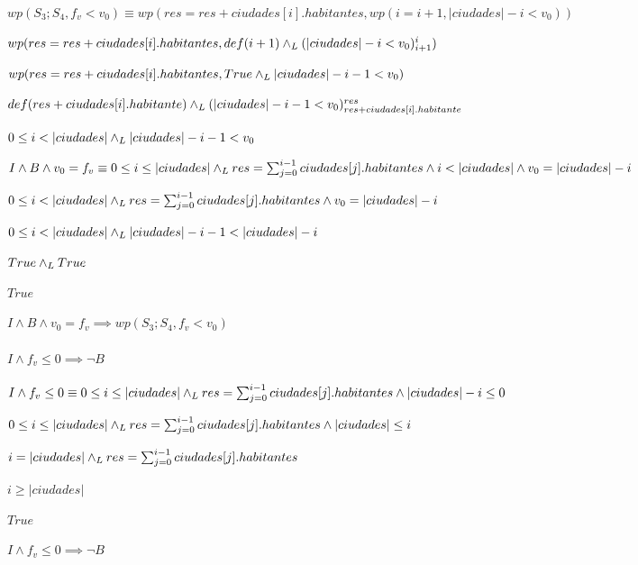 \documentclass[10pt,a4paper]{article}
\begin{document}
$wp(S_{3};S_{4}, f_{v} < v_{0}) \equiv wp(res = res + ciudades[i].habitantes, wp(i = i + 1, |ciudades| - i < v_{0}))$ \equiv \par
\vspace{5px}
$wp(res = res + ciudades[i].habitantes, def(i+1) \land _L (|ciudades| - i < v_{0})_{i+1}^{i}) $ \equiv \par
\vspace{5px}
$wp(res = res + ciudades[i].habitantes, True \land _L |ciudades| - i - 1 < v_{0})$ \equiv \par
\vspace{5px}
$def(res + ciudades[i].habitante) \land _L (|ciudades| - i - 1 < v_{0})_{res + ciudades[i].habitante}^{res}$ \equiv \par
\vspace{5px}
$0 \leq i < |ciudades| \land _L |ciudades| - i - 1 < v_{0}$ \equiv \par
\vspace{20px}
$I \wedge  B \wedge v_{0}=f_{v} \equiv 0 \leq i \leq |ciudades| \land _L res = \sum_{j=0}^{i-1} ciudades[j].habitantes \wedge i < |ciudades| \wedge v_{0}=|ciudades| - i$ \equiv \par
\begin{center}
    $0 \leq i < |ciudades| \land _L res = \sum_{j=0}^{i-1} ciudades[j].habitantes \wedge v_{0}=|ciudades| - i$ \implies \par
    \vspace{5px}
    $0 \leq i < |ciudades| \land _L |ciudades| - i - 1 < |ciudades| - i$ \equiv \par
    \vspace{5px}
    $True \land _L True$ \equiv \par
    \vspace{5px}
    $True$ \par
    \vspace{5px}
    $I \wedge  B \wedge v_{0}=f_{v} \implies wp(S_{3};S_{4}, f_{v} < v_{0})$
\end{center}



\paragraph{$I \wedge f_{v} \leq 0 \implies \neg B$}
$I \wedge f_{v} \leq 0 \equiv 0 \leq i \leq |ciudades| \land _L res = \sum_{j=0}^{i-1} ciudades[j].habitantes \wedge |ciudades| - i \leq 0$ \equiv \par
\begin{center}
    $0 \leq i \leq |ciudades| \land _L res = \sum_{j=0}^{i-1} ciudades[j].habitantes \wedge |ciudades| \leq i$ \equiv \par
    \vspace{5px}
    $i = |ciudades| \land _L res = \sum_{j=0}^{i-1} ciudades[j].habitantes $ \implies \par
    \vspace{5px}
    $i \geq |ciudades|$ \equiv \par
    \vspace{5px}
    $True$ \par
    \vspace{5px}
    $I \wedge f_{v} \leq 0 \implies \neg B$
\end{center}
\end{document}

